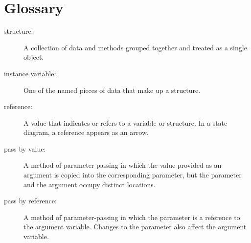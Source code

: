 \section{Glossary}

\begin{description}

\item[structure:]  A collection of data and methods grouped together and
treated as a single object.

\item[instance variable:]  One of the named pieces of data that make up
a structure.

\item[reference:]  A value that indicates or refers to a variable
or structure.  In a state diagram, a reference appears as an arrow.

\item[pass by value:]  A method of parameter-passing in which the
value provided as an argument is copied into the corresponding
parameter, but the parameter and the argument occupy distinct
locations.

\item[pass by reference:]  A method of parameter-passing in which
the parameter is a reference to the argument variable.  Changes
to the parameter also affect the argument variable.


\end{description}

